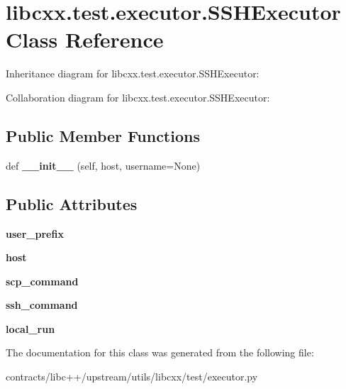 \hypertarget{classlibcxx_1_1test_1_1executor_1_1_s_s_h_executor}{}\section{libcxx.\+test.\+executor.\+S\+S\+H\+Executor Class Reference}
\label{classlibcxx_1_1test_1_1executor_1_1_s_s_h_executor}


Inheritance diagram for libcxx.\+test.\+executor.\+S\+S\+H\+Executor\+:


Collaboration diagram for libcxx.\+test.\+executor.\+S\+S\+H\+Executor\+:
\subsection*{Public Member Functions}
\begin{DoxyCompactItemize}
\item 
\mbox{\label{classlibcxx_1_1test_1_1executor_1_1_s_s_h_executor_abcb5593379d7433bff5bab13ed1bf911}} 
def {\bfseries \+\_\+\+\_\+init\+\_\+\+\_\+} (self, host, username=None)
\end{DoxyCompactItemize}
\subsection*{Public Attributes}
\begin{DoxyCompactItemize}
\item 
\mbox{\label{classlibcxx_1_1test_1_1executor_1_1_s_s_h_executor_a7666bfbc7de24f8ec71cfb5beca8fff8}} 
{\bfseries user\+\_\+prefix}
\item 
\mbox{\label{classlibcxx_1_1test_1_1executor_1_1_s_s_h_executor_aab4cb6e17b4ff7f7f36131f61821551c}} 
{\bfseries host}
\item 
\mbox{\label{classlibcxx_1_1test_1_1executor_1_1_s_s_h_executor_a6c7e28dd07e43b7d9bb53e7a96b2e86f}} 
{\bfseries scp\+\_\+command}
\item 
\mbox{\label{classlibcxx_1_1test_1_1executor_1_1_s_s_h_executor_a77b890fd96fd18f7ba2c165fbcd2b062}} 
{\bfseries ssh\+\_\+command}
\item 
\mbox{\label{classlibcxx_1_1test_1_1executor_1_1_s_s_h_executor_af7cc5f9f6a88b47ca670236a5098230f}} 
{\bfseries local\+\_\+run}
\end{DoxyCompactItemize}


The documentation for this class was generated from the following file\+:\begin{DoxyCompactItemize}
\item 
contracts/libc++/upstream/utils/libcxx/test/executor.\+py\end{DoxyCompactItemize}
